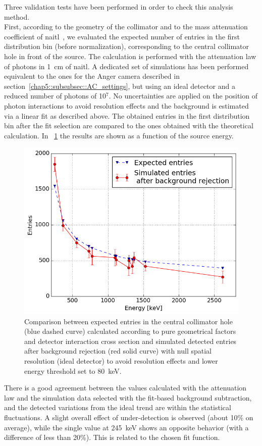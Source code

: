Three validation tests have been performed in order to check this analysis method.\\ 
First, according to the geometry of the collimator and to the mass attenuation coefficient of \gls{naitl}~\parencite{Hubbell1987}, we evaluated the expected number of entries in the first distribution bin (before normalization), corresponding to the central collimator hole in front of the source. The calculation is performed with the attenuation law of photons in 1~cm of \gls{naitl}. A dedicated set of simulations has been performed equivalent to the ones for the Anger camera described in section~\ref{chap5::subsubsec::AC_settings}, but using an ideal detector and a reduced number of photons of 10$^7$. No uncertainties are applied on the position of photon interactions to avoid resolution effects and the background is estimated via a linear fit as described above. The obtained entries in the first distribution bin after the fit selection are compared to the ones obtained with the theoretical calculation. In \figurename~\ref{chap5::fig::firstBinCheck} the results are shown as a function of the source energy.


\begin{figure}[h]
  \centering
  \includegraphics[width=.6\textwidth]{03_GraphicFiles/chapter5_SPECTsimu/SPECT/anger/firstBinInVSenergy}
\caption{Comparison between expected entries in the central collimator hole (blue dashed curve) calculated according to pure geometrical factors and detector interaction cross section and simulated detected entries after background rejection (red solid curve) with null spatial resolution (ideal detector) to avoid resolution effects and lower energy threshold set to 80~keV.}
\label{chap5::fig::firstBinCheck}
\end{figure}

There is a good agreement between the values calculated with the attenuation law and the simulation data selected with the fit-based background subtraction, and the detected variations from the ideal trend are within the statistical fluctuations. A slight overall effect of under-detection is observed (about 10\% on average), while the single value at 245~keV shows an opposite behavior (with a difference of less than 20\%). This is related to the chosen fit function.


